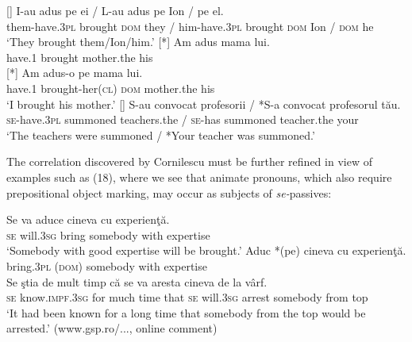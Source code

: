 \documentclass[output=paper]{langsci/langscibook}
\begin{document}
\begin{xlista}[c{'}{'}.]
    []{
    \gll I-au                 adus      pe    ei    /   L-au               adus      pe    Ion /   pe    el.\\
         them-have.\textsc{3pl} brought \textsc{dom} they /  him-have.\textsc{3pl} brought \textsc{dom} Ion /  \textsc{dom} he\\
    \glt ‘They brought them/Ion/him.’}
    [*]{
    \gll Am      adus     mama         lui. \\
         have.\textsc{1} brought mother.the his\\
    }
    [*]{
     \gll Am      adus-o               pe    mama         lui. \\
           have.\textsc{1} brought-her(\textsc{cl}) \textsc{dom} mother.the his \\
     \glt       ‘I brought his mother.’
    }
    []{
    \gll S-au            convocat   profesorii     / *S-a convocat        profesorul   tău. \\
         \textsc{se-}have.\textsc{3pl} summoned teachers.the / \textsc{se-}has summoned teacher.the your \\
    \glt ‘The teachers were summoned / *Your teacher was summoned.’}
    \end{xlista}
\z

The correlation discovered by Cornilescu must be further refined in view of examples such as (18), where we see that animate  pronouns, which also require prepositional object marking, may occur as subjects of \textit{se-}passives:

\ea%
    \label{ex:giurgea:18}
    \ea
    \gll  Se va           aduce  cineva       cu    experienţă.\\
         \textsc{se} will.\textsc{3sg}  bring   somebody with expertise\\
    \glt ‘Somebody with good expertise will be brought.’
    \ex
    \gll Aduc      *(pe)   cineva        cu    experienţă.\\
         bring.\textsc{3pl} (\textsc{dom}) somebody with expertise\\
    \ex
    \gll Se ştia                  de  mult  timp  că   se  va          aresta cineva       {de la} vârf.\\
         \textsc{se} know.\textsc{impf.3sg} for much time that \textsc{se} will.\textsc{3sg} arrest somebody from top\\
    \glt ‘It had been known for a long time that somebody from the top would be arrested.’ (www.gsp.ro/..., online comment)
    \z
\z    
\end{document}
